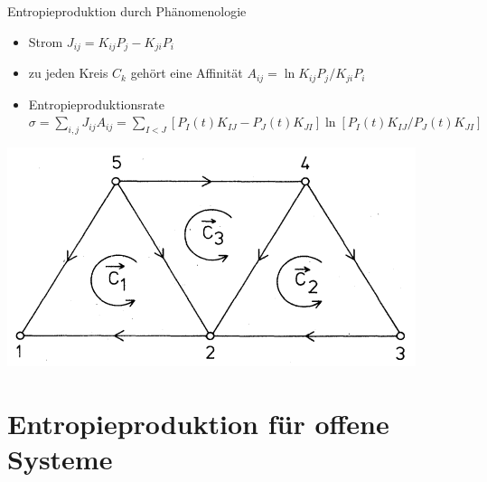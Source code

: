\documentclass[aspectratio=1610, 9pt]{beamer}
\begin{document}
\begin{frame}{Entropieproduktion durch Phänomenologie}
  \begin{minipage}{0.5\textwidth}
    \begin{itemize}
      \item Strom $J_{ij} = K_{ij} P_j - K_{ji} P_i$
      \item zu jeden Kreis $C_k$ gehört eine Affinität $A_{ij} = \ln K_{ij} P_j / K_{ji} P_i$
      \item Entropieproduktionsrate $\sigma = \sum_{i,j} J_{ij} A_{ij }= \sum_{I<J} [P_I(t)K_{IJ}-P_J(t)K_{JI}] \ln[P_I(t)K_{IJ}/P_J(t)K_{JI}] $
    \end{itemize}
  \end{minipage}
\begin{minipage}{0.4\textwidth}
    \begin{center}
      \includegraphics[width=\textwidth]{images/circle.png}
    \end{center}
  \end{minipage}
\end{frame}



\section{Entropieproduktion für offene Systeme}
\end{document}
